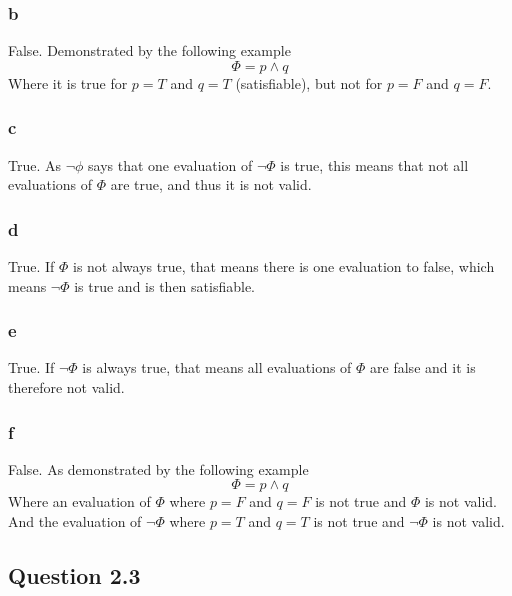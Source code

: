 \documentclass[12pt]{article}
\begin{document}
\subsubsection*{b}
False. Demonstrated by the following example
$$\Phi=p\land q$$
Where it is true for $p=T$ and $q=T$ (satisfiable), but not for $p=F$ and $q=F$.

\subsubsection*{c}
True. As $\neg\phi$ says that one evaluation of $\neg\Phi$ is true, this means that not all evaluations of $\Phi$ are true, and thus it is not valid.

\subsubsection*{d}
True. If $\Phi$ is not always true, that means there is one evaluation to false, which means $\neg\Phi$ is true and is then satisfiable.

\subsubsection*{e}
True. If $\neg\Phi$ is always true, that means all evaluations of $\Phi$ are false and it is therefore not valid.

\subsubsection*{f}
False. As demonstrated by the following example
$$\Phi=p\land q$$
Where an evaluation of $\Phi$ where $p=F$ and $q=F$ is not true and $\Phi$ is not valid.\\
And the evaluation of $\neg\Phi$ where $p=T$ and $q=T$ is not true and $\neg\Phi$ is not valid.

\subsection*{Question 2.3}
\end{document}
